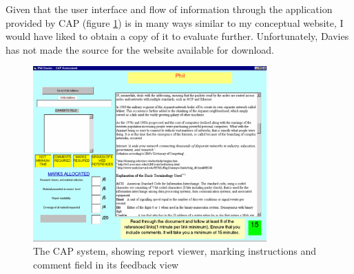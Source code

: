 \documentclass[a4paper,11pt]{report}
\begin{document}
Given that the user interface and flow of information through the application provided by CAP (figure \ref{fig:cap}) is in many ways similar to my conceptual website, I would have liked to obtain a copy of it to evaluate further. Unfortunately, Davies has not made the source for the website available for download.\par
\begin{figure}[ht]
\centering
\includegraphics[width=0.8\textwidth]{fig/CAP.png}
\caption{\footnotesize The CAP system, showing report viewer, marking instructions and comment field in its feedback view}
\label{fig:cap}
\end{figure}
\end{document}

